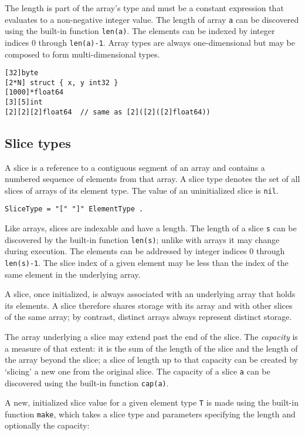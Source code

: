 The length is part of the array's type and must be a constant
expression that evaluates to a non-negative integer value. The
length of array \texttt{a} can be discovered using the built-in
function \texttt{len(a)}. The elements can be indexed by integer
indices 0 through \texttt{len(a)-1}. Array types are always
one-dimensional but may be composed to form multi-dimensional types.

\begin{Verbatim}[frame=single]
[32]byte
[2*N] struct { x, y int32 }
[1000]*float64
[3][5]int
[2][2][2]float64  // same as [2]([2]([2]float64))
\end{Verbatim}

\subsection*{Slice types}

A slice is a reference to a contiguous segment of an array and contains
a numbered sequence of elements from that array. A slice type denotes
the set of all slices of arrays of its element type. The value of an
uninitialized slice is \texttt{nil}.

\begin{Verbatim}[frame=single]
SliceType = "[" "]" ElementType .
\end{Verbatim}

Like arrays, slices are indexable and have a length. The length of
a slice \texttt{s} can be discovered by the built-in function
\texttt{len(s)}; unlike with arrays it may change during execution.
The elements can be addressed by integer indices 0 through
\texttt{len(s)-1}. The slice index of a given element may be less
than the index of the same element in the underlying array.

A slice, once initialized, is always associated with an underlying array
that holds its elements. A slice therefore shares storage with its array
and with other slices of the same array; by contrast, distinct arrays
always represent distinct storage.

The array underlying a slice may extend past the end of the slice.
The \emph{capacity} is a measure of that extent: it is the sum of
the length of the slice and the length of the array beyond the
slice; a slice of length up to that capacity can be created by
`slicing' a new one from the original slice. The capacity of a slice
\texttt{a} can be discovered using the built-in function \texttt{cap(a)}.

A new, initialized slice value for a given element type \texttt{T} is
made using the built-in function
\texttt{make}, which
takes a slice type and parameters specifying the length and optionally
the capacity:

